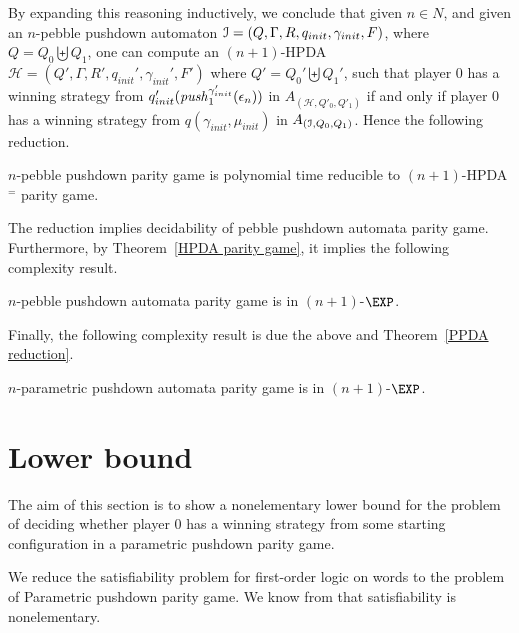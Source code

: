 \documentclass[a4paper,UKenglish,cleveref, autoref, thm-restate]{lipics-v2021}
\renewcommand{\H}{\mathcal{H}}
\begin{document}
{By expanding this reasoning inductively, we conclude that given $n \in N$, and
given an $n$-pebble pushdown automaton 
$\mathcal{I} = (Q, \Gamma, R, q_{init}, \gamma_{init}, F)$, where $Q= Q_0 \biguplus Q_1$,
one can compute an $(n+1)$-HPDA 
$\H = (Q', \Gamma, R', q_{init}', \gamma_{init}', F')$  where $Q'= Q_0' \biguplus Q_1'$, 
such 
that 
player $0$ has a winning strategy from $q'_{init}(\text{\textit{push}}_1^{\gamma_{init}'}(\epsilon_{n}))$ in $A_{(\H,Q'_0,Q'_1)}$ 
if
and only if
player $0$ has a winning strategy from $q(\gamma_{init},\mu_{init})$ in $A_{(\mathcal{I},Q_0,Q_1)}$. 
Hence the following reduction.

\begin{theorem} 
{\sc $n$-pebble pushdown parity game} is polynomial time reducible
to {\sc $(n+1)$-HPDA$^=$ parity game}.
\end{theorem}

The reduction implies decidability of pebble pushdown automata parity game. Furthermore,
by Theorem~\ref{HPDA parity game}, it implies the following complexity result.


\begin{theorem}
{\sc $n$-pebble pushdown automata parity game} is in $(n+1)$-$\EXP$.
\end{theorem}

Finally, the following complexity result is due the above and Theorem~\ref{PPDA reduction}.

\begin{corollary}
{\sc $n$-parametric pushdown automata parity game} is in $(n+1)$-$\EXP$.
\end{corollary}













\section{Lower bound}

The aim of this section is to show a nonelementary lower bound for the 
problem of deciding whether player $0$ has a winning strategy from some starting configuration in
a parametric pushdown parity game.

We reduce the satisfiability problem for first-order logic on words
to the problem of {\sc Parametric pushdown parity game}. 
We know from \cite{Sto74}
that satisfiability is nonelementary. 
%

}
\end{document}
